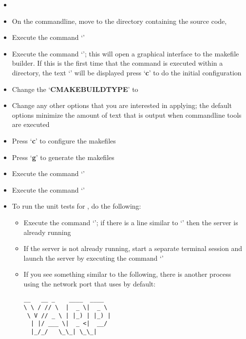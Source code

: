 \tertiaryEnd{}
\begin{itemize}
\item\TBD{}
\end{itemize}
\tertiaryEnd{}
\secondaryEnd{}
\begin{itemize}
\item On the command\longDash{}line, move to the directory containing the \mplusm{} source
code, 
\item\exSp{} Execute the command `'
\item\exSp{} Execute the command `'; this will open a graphical interface
to the makefile builder. If this is the first time that the command is executed within a
directory, the text `' will be displayed \longDash{} press
`\textbf{c}' to do the initial configuration
\item\exSp{} Change the `\textbf{CMAKE\fUS{}BUILD\fUS{}TYPE}' to 
\item\exSp{} Change any other options that you are interested in applying; the default
options minimize the amount of text that is output when \mplusm{} command\longDash{}line
tools are executed
\item\exSp{} Press `\textbf{c}' to configure the makefiles
\item\exSp{} Press `\textbf{g}' to generate the makefiles
\item\exSp{} Execute the command `'
\item\exSp{} Execute the command `'
\item\exSp{} To run the unit tests for \mplusm{}, do the following:
\begin{itemize}
\item Execute the command `'; if there is a line
similar to `' then the \yarp{}
server is already running
\item\exSp{} If the \yarp{} server is not already running, start a separate terminal
session and launch the \yarp{} server by executing the command `'
\item\exSp{} If you see something similar to the following, there is another process using
the network port that \yarp{} uses by default:
\outputBegin{}
\begin{verbatim}
__   __ _    ____  ____  
\ \ / // \  |  _ \|  _ \ 
 \ V // _ \ | |_) | |_) |
  | |/ ___ \|  _ <|  __/ 
  |_/_/   \_\_| \_\_|    


\end{verbatim}
\end{itemize}
\end{itemize}
